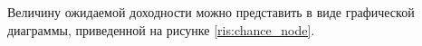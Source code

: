 Величину ожидаемой доходности можно представить в виде графической диаграммы, приведенной на рисунке \ref{ris:chance_node}.

%	
%			
%


